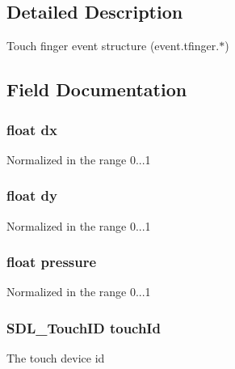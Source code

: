 \subsection{Detailed Description}
Touch finger event structure (event.\+tfinger.$\ast$) 

\subsection{Field Documentation}
\subsubsection[{\texorpdfstring{dx}{dx}}]{\setlength{\rightskip}{0pt plus 5cm}float dx}\hypertarget{struct_s_d_l___touch_finger_event_a9eae6c1f38db98ab568f3ed3771a969d}{}\label{struct_s_d_l___touch_finger_event_a9eae6c1f38db98ab568f3ed3771a969d}
Normalized in the range 0...1 
\subsubsection[{\texorpdfstring{dy}{dy}}]{\setlength{\rightskip}{0pt plus 5cm}float dy}\hypertarget{struct_s_d_l___touch_finger_event_a8f461b6142ce8725218813abb23b06a3}{}\label{struct_s_d_l___touch_finger_event_a8f461b6142ce8725218813abb23b06a3}
Normalized in the range 0...1 
\subsubsection[{\texorpdfstring{pressure}{pressure}}]{\setlength{\rightskip}{0pt plus 5cm}float pressure}\hypertarget{struct_s_d_l___touch_finger_event_ac870e1249bab4a2a68cc4126761d24ef}{}\label{struct_s_d_l___touch_finger_event_ac870e1249bab4a2a68cc4126761d24ef}
Normalized in the range 0...1 
\subsubsection[{\texorpdfstring{touch\+Id}{touchId}}]{\setlength{\rightskip}{0pt plus 5cm}S\+D\+L\+\_\+\+Touch\+ID touch\+Id}\hypertarget{struct_s_d_l___touch_finger_event_a35f615f6a1333a7d89297b58ed1e9bbb}{}\label{struct_s_d_l___touch_finger_event_a35f615f6a1333a7d89297b58ed1e9bbb}
The touch device id 

